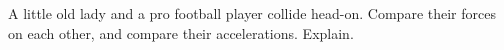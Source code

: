 A little old lady and a pro football player collide
head-on. Compare their forces on each other, and compare
their accelerations. Explain.
